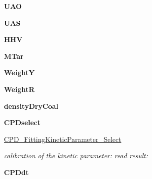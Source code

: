 \begin{DoxyCompactItemize}
\item 
\hypertarget{classPKP_1_1MainProcess_a6e61e776f84b768114c9942eeb673c5c}{{\bfseries \-U\-A\-O}}\label{classPKP_1_1MainProcess_a6e61e776f84b768114c9942eeb673c5c}

\item 
\hypertarget{classPKP_1_1MainProcess_a34fd1315483b9afc323c5986caf86db0}{{\bfseries \-U\-A\-S}}\label{classPKP_1_1MainProcess_a34fd1315483b9afc323c5986caf86db0}

\item 
\hypertarget{classPKP_1_1MainProcess_a49f84a473f53770f7ca0bea6505922eb}{{\bfseries \-H\-H\-V}}\label{classPKP_1_1MainProcess_a49f84a473f53770f7ca0bea6505922eb}

\item 
\hypertarget{classPKP_1_1MainProcess_a3d9263b59fb40d2dbbbb240265e2add9}{{\bfseries \-M\-Tar}}\label{classPKP_1_1MainProcess_a3d9263b59fb40d2dbbbb240265e2add9}

\item 
\hypertarget{classPKP_1_1MainProcess_a42f5f1515c727d31e14afd425802e0bf}{{\bfseries \-Weight\-Y}}\label{classPKP_1_1MainProcess_a42f5f1515c727d31e14afd425802e0bf}

\item 
\hypertarget{classPKP_1_1MainProcess_a865afb6bfa48c27b5f23ea37db5f9cb7}{{\bfseries \-Weight\-R}}\label{classPKP_1_1MainProcess_a865afb6bfa48c27b5f23ea37db5f9cb7}

\item 
\hypertarget{classPKP_1_1MainProcess_a902cc4280fcdc2b074e3d652d2a6f6b1}{{\bfseries density\-Dry\-Coal}}\label{classPKP_1_1MainProcess_a902cc4280fcdc2b074e3d652d2a6f6b1}

\item 
\hypertarget{classPKP_1_1MainProcess_ac99778405524b930c5c4da1129602151}{{\bfseries \-C\-P\-Dselect}}\label{classPKP_1_1MainProcess_ac99778405524b930c5c4da1129602151}

\item 
\hypertarget{classPKP_1_1MainProcess_a2667551f87e9ffaaa5d2377dac3c25c5}{\hyperlink{classPKP_1_1MainProcess_a2667551f87e9ffaaa5d2377dac3c25c5}{\-C\-P\-D\-\_\-\-Fitting\-Kinetic\-Parameter\-\_\-\-Select}}\label{classPKP_1_1MainProcess_a2667551f87e9ffaaa5d2377dac3c25c5}

\begin{DoxyCompactList}\small\item\em calibration of the kinetic parameter\-: read result\-: \end{DoxyCompactList}\item 
\hypertarget{classPKP_1_1MainProcess_ad6c0f4a6249d8a41749fa3366a151dfb}{{\bfseries \-C\-P\-Ddt}}\label{classPKP_1_1MainProcess_ad6c0f4a6249d8a41749fa3366a151dfb}


\end{DoxyCompactItemize}
